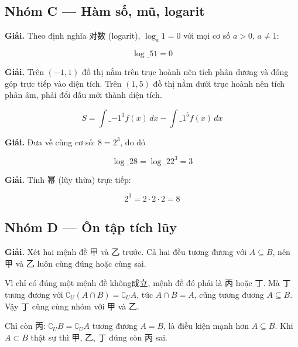 \documentclass[11pt, a4paper]{article}
\begin{document}
\subsection*{Nhóm C — Hàm số, mũ, logarit}

\begin{dapan}[20 — Đáp án D]
\textbf{Giải.} Theo định nghĩa 对数 (logarit), $\log_a 1 = 0$ với mọi cơ số $a > 0$, $a \ne 1$:

$$\log\_5 1 = 0$$
\end{dapan}

\begin{dapan}[21 — Đáp án B]
\textbf{Giải.} Trên $(-1, 1)$ đồ thị nằm trên trục hoành nên tích phân dương và đóng góp trực tiếp vào diện tích. Trên $(1, 5)$ đồ thị nằm dưới trục hoành nên tích phân âm, phải đổi dấu mới thành diện tích.

$$S = \int\_{-1}^{1} f(x)\,dx - \int\_{1}^{5} f(x)\,dx$$
\end{dapan}

\begin{dapan}[22 — Đáp án C]
\textbf{Giải.} Đưa về cùng cơ số: $8 = 2^3$, do đó

$$\log\_2 8 = \log\_2 2^3 = 3$$
\end{dapan}

\begin{dapan}[23 — Đáp án B]
\textbf{Giải.} Tính 幂 (lũy thừa) trực tiếp:

$$2^3 = 2 \cdot 2 \cdot 2 = 8$$
\end{dapan}

\subsection*{Nhóm D — Ôn tập tích lũy}

\begin{dapan}[24 — Đáp án C]
\textbf{Giải.} Xét hai mệnh đề 甲 và 乙 trước. Cả hai đều tương đương với $A \subseteq B$, nên 甲 và 乙 luôn cùng đúng hoặc cùng sai.

Vì chỉ có đúng một mệnh đề không成立, mệnh đề đó phải là 丙 hoặc 丁. Mà 丁 tương đương với $\complement_U(A \cap B) = \complement_U A$, tức $A \cap B = A$, cũng tương đương $A \subseteq B$. Vậy 丁 cũng cùng nhóm với 甲 và 乙.

Chỉ còn 丙: $\complement_U B = \complement_U A$ tương đương $A = B$, là điều kiện mạnh hơn $A \subseteq B$. Khi $A \subset B$ thật sự thì 甲, 乙, 丁 đúng còn 丙 sai.
\end{dapan}
\end{document}
